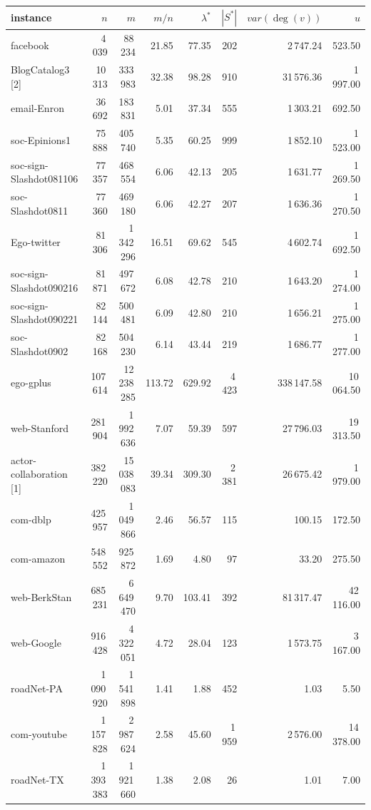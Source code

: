 \begin{tabular}{lrrrrrrr}
\toprule
instance & $n$ & $m$ & $m/n$ & $\lambda^*$ & $|S^*|$ & $var(\deg(v))$ & $u$ \\
\midrule
facebook & 4\,039 & 88\,234 & 21.85 & 77.35 & 202 & 2\,747.24 & 523.50 \\
BlogCatalog3 [2] & 10\,313 & 333\,983 & 32.38 & 98.28 & 910 & 31\,576.36 & 1\,997.00 \\
email-Enron & 36\,692 & 183\,831 & 5.01 & 37.34 & 555 & 1\,303.21 & 692.50 \\
soc-Epinions1 & 75\,888 & 405\,740 & 5.35 & 60.25 & 999 & 1\,852.10 & 1\,523.00 \\
soc-sign-Slashdot081106 & 77\,357 & 468\,554 & 6.06 & 42.13 & 205 & 1\,631.77 & 1\,269.50 \\
soc-Slashdot0811 & 77\,360 & 469\,180 & 6.06 & 42.27 & 207 & 1\,636.36 & 1\,270.50 \\
Ego-twitter & 81\,306 & 1\,342\,296 & 16.51 & 69.62 & 545 & 4\,602.74 & 1\,692.50 \\
soc-sign-Slashdot090216 & 81\,871 & 497\,672 & 6.08 & 42.78 & 210 & 1\,643.20 & 1\,274.00 \\
soc-sign-Slashdot090221 & 82\,144 & 500\,481 & 6.09 & 42.80 & 210 & 1\,656.21 & 1\,275.00 \\
soc-Slashdot0902 & 82\,168 & 504\,230 & 6.14 & 43.44 & 219 & 1\,686.77 & 1\,277.00 \\
ego-gplus & 107\,614 & 12\,238\,285 & 113.72 & 629.92 & 4\,423 & 338\,147.58 & 10\,064.50 \\
web-Stanford & 281\,904 & 1\,992\,636 & 7.07 & 59.39 & 597 & 27\,796.03 & 19\,313.50 \\
actor-collaboration [1] & 382\,220 & 15\,038\,083 & 39.34 & 309.30 & 2\,381 & 26\,675.42 & 1\,979.00 \\
com-dblp & 425\,957 & 1\,049\,866 & 2.46 & 56.57 & 115 & 100.15 & 172.50 \\
com-amazon & 548\,552 & 925\,872 & 1.69 & 4.80 & 97 & 33.20 & 275.50 \\
web-BerkStan & 685\,231 & 6\,649\,470 & 9.70 & 103.41 & 392 & 81\,317.47 & 42\,116.00 \\
web-Google & 916\,428 & 4\,322\,051 & 4.72 & 28.04 & 123 & 1\,573.75 & 3\,167.00 \\
roadNet-PA & 1\,090\,920 & 1\,541\,898 & 1.41 & 1.88 & 452 & 1.03 & 5.50 \\
com-youtube & 1\,157\,828 & 2\,987\,624 & 2.58 & 45.60 & 1\,959 & 2\,576.00 & 14\,378.00 \\
roadNet-TX & 1\,393\,383 & 1\,921\,660 & 1.38 & 2.08 & 26 & 1.01 & 7.00 \\

\end{tabular}
